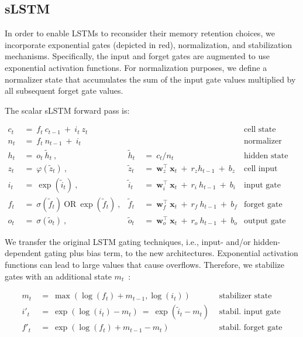 \subsection{sLSTM}
\label{sec:sLSTM}

In order to enable LSTMs to reconsider their memory retention choices, we incorporate exponential gates (depicted in red), normalization, and stabilization mechanisms. Specifically, the input and forget gates are augmented to use exponential activation functions. For normalization purposes, we define a normalizer state that accumulates the sum of the input gate values multiplied by all subsequent forget gate values.

The scalar sLSTM forward pass is:

\begin{align}
\label{eq:slstmforward}
c_t \ &= \  f_t \ c_{t-1} \ + \ i_t \ z_t & & 
 &\text{cell state} \\
n_t \ &= \  f_t \ n_{t-1} \ + \ i_t  & & 
 &\text{normalizer state} \\
h_t \ &= \ o_t \ \tilde{h}_t \ ,
  &\tilde{h}_t \ &= \ c_t / n_t
&\text{hidden state} \\
z_t \ &= \ \varphi \left( \tilde{z}_t \right) \ , 
  &\tilde{z}_t \ &=  \ \mathbf{w}^\top_{z} \ \mathbf{x}_t \ + \
  r_{z}  h_{t-1} \ + \  b_{z}
  &\text{cell input} \\
i_t \ &= \ \!\exp \left( \tilde{i}_t  \right) \ , 
  &\tilde{i}_t \ &= \ \mathbf{w}^\top_{i} \ \mathbf{x}_t \ + \
  r_{i}  \ h_{t-1} \ + \  b_{i}
  &\text{input gate} \\
f_t \ &= \ \sigma \left(  \tilde{f}_t \right) \ \text{OR} \
\!\exp \left(  \tilde{f}_t \right) \ ,
  &\tilde{f}_t \ &= \ \mathbf{w}^\top_{f} \ \mathbf{x}_t  \ + \
  r_{f}  \ h_{t-1} \ + \  b_{f}
  &\text{forget gate} \\
o_t \ &= \ \sigma \left( \tilde{o}_t \right) \ , 
  &\tilde{o}_t  \ &= \ \mathbf{w}^\top_{o} \ \mathbf{x}_t \ + \
  r_{o}  \ h_{t-1} \ + \  b_{o}
  &\text{output gate} 
\end{align}

We transfer the original LSTM gating techniques, i.e., input- and/or hidden-dependent gating plus bias term, to the new architectures. Exponential activation functions can lead to large values that cause overflows. Therefore, we stabilize gates with an additional state \mbox{$m_t$~\citep{Milakov:18arxiv}}:

\begin{align}
\label{eq:slstmstabil}
m_t \ &= \ \max \left( \log ( f_t ) + m_{t-1} , \log ( i_t ) \right) &\text{stabilizer state} \\
i'_t \ &= \ \!\exp \left( \log \left ( i_t \right) - m_t \right) \ = \ \!\exp \left( \tilde{i}_t - m_t \right) \ \, 
  &\text{stabil. input gate} \\
f'_t \ &= \ \!\exp \left( \log \left( f_t \right) + m_{t-1} - m_t \right) \ \, 
  &\text{stabil. forget gate}
\end{align}

